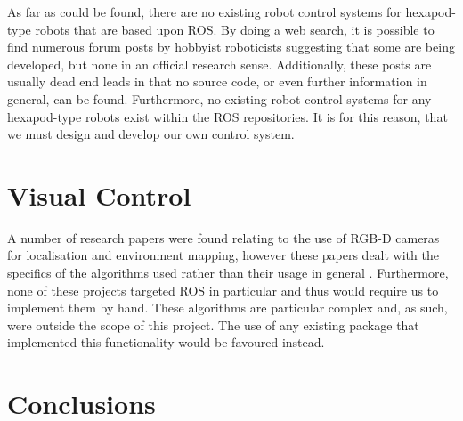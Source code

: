 As far as could be found, there are no existing robot control systems for hexapod-type robots that are based upon ROS. By doing a web search, it is possible to find numerous forum posts by hobbyist roboticists suggesting that some are being developed, but none in an official research sense. Additionally, these posts are usually dead end leads in that no source code, or even further information in general, can be found. Furthermore, no existing robot control systems for any hexapod-type robots exist within the ROS repositories. It is for this reason, that we must design and develop our own control system.


\section{Visual Control}

A number of research papers were found relating to the use of RGB-D cameras for localisation and environment mapping, however these papers dealt with the specifics of the algorithms used rather than their usage in general \cite{correa2012mobile, biswas2012depth, cunha2011using}. Furthermore, none of these projects targeted ROS in particular and thus would require us to implement them by hand. These algorithms are particular complex and, as such, were outside the scope of this project. The use of any existing package that implemented this functionality would be favoured instead.


\section{Conclusions}